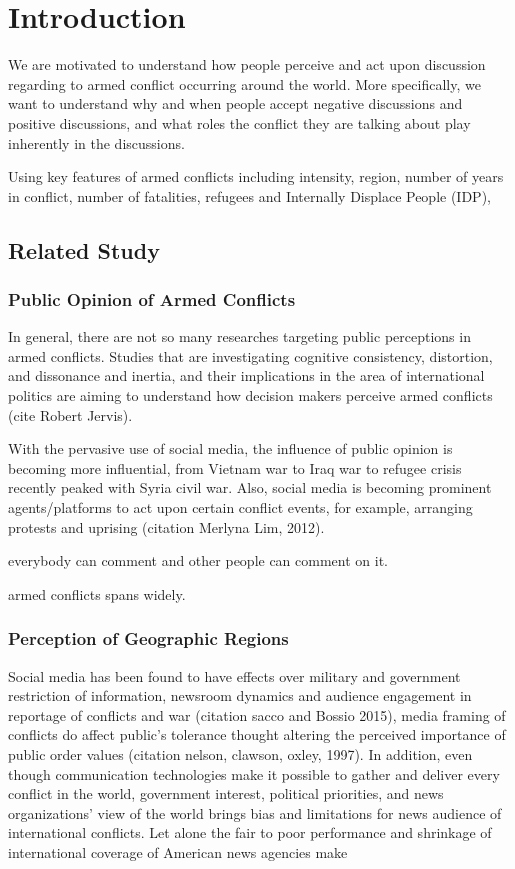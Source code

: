 



\chapter{Introduction}
We are motivated to understand how people perceive and act upon discussion regarding to armed conflict occurring around the world. More specifically, we want to understand why and when people accept negative discussions and positive discussions, and what roles the conflict they are talking about play inherently in the discussions. 

Using key features of armed conflicts including intensity, region, number of years in conflict, number of fatalities, refugees and Internally Displace People (IDP), 


\section{Related Study}
\subsection{Public Opinion of Armed Conflicts}
In general, there are not so many researches targeting public perceptions in armed conflicts. Studies that are investigating cognitive consistency, distortion, and dissonance and inertia, and their implications in the area of international politics are aiming to understand how decision makers perceive armed conflicts (cite Robert Jervis). 

With the pervasive use of social media, the influence of public opinion is becoming more influential, from Vietnam war to Iraq war to refugee crisis recently peaked with Syria civil war. Also, social media is becoming prominent agents/platforms to act upon certain conflict events, for example, arranging protests and uprising (citation Merlyna Lim, 2012).

everybody can comment and other people can comment on it.

armed conflicts spans widely.

\subsection{Perception of Geographic Regions}
Social media has been found to have effects over military and government restriction of information, newsroom dynamics and audience engagement in reportage of conflicts and war (citation sacco and Bossio 2015), media framing of conflicts do affect public's tolerance thought altering the perceived importance of public order values (citation nelson, clawson, oxley, 1997).  In addition, even though communication technologies make it possible to gather and deliver every conflict in the world, government interest, political priorities, and news organizations' view of the world brings bias and limitations for news audience of international conflicts. Let alone the fair to poor performance and shrinkage of international coverage of American news agencies make 



